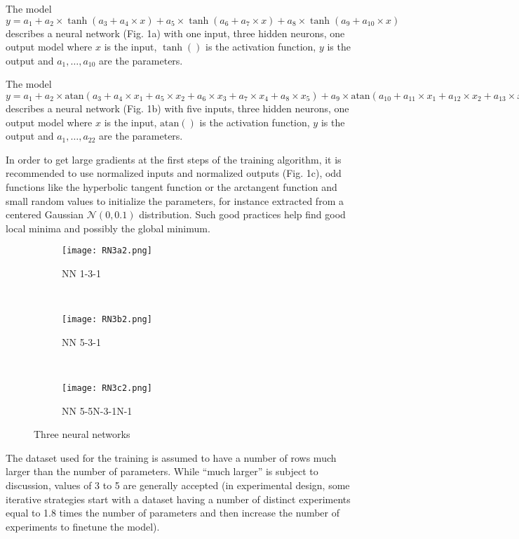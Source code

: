 The model
\(y = a_1 + a_2\times \tanh(a_3 + a_4\times x) + a_5\times \tanh(a_6 + a_7\times x) + a_8\times \tanh(a_9 + a_{10}\times x)\)
describes a neural network (Fig. 1a) with one input, three hidden
neurons, one output model where \(x\) is the input, \(\tanh()\) is the
activation function, \(y\) is the output and \(a_1,\dots,a_{10}\) are
the parameters.

The model
\(y = a_1 + a_2\times \text{atan}(a_3 + a_4\times x_1 + a_5\times x_2 + a_6\times x_3 + a_7\times x_4 + a_8\times x_5) + a_9\times \text{atan}(a_{10} + a_{11}\times x_1 + a_{12}\times x_2 + a_{13}\times x_3 + a_{14}\times x_4 + a_{15}\times x_5) + a_{16}\text{atan}(a_{17} + a_{18}\times x_1 + a_{19}\times x_2 + a_{20}\times x_3 + a_{21}\times x_4 + a_{22}\times x_5)\)
describes a neural network (Fig. 1b) with five inputs, three hidden
neurons, one output model where \(x\) is the input, \(\text{atan}()\) is
the activation function, \(y\) is the output and \(a_1,\dots,a_{22}\)
are the parameters.

In order to get large gradients at the first steps of the training
algorithm, it is recommended to use normalized inputs and normalized
outputs (Fig. 1c), odd functions like the hyperbolic tangent function or
the arctangent function and small random values to initialize the
parameters, for instance extracted from a centered Gaussian
\(\mathcal N(0, 0.1)\) distribution. Such good practices help find good
local minima and possibly the global minimum.

\begin{figure}
    \centering
    \begin{subfigure}[b]{0.242\textwidth}
        \texttt{[image: RN3a2.png]}
        \caption{NN 1-3-1}
        \label{fig:N131}
    \end{subfigure}
    ~ 
    \begin{subfigure}[b]{0.250\textwidth}
        \texttt{[image: RN3b2.png]}
        \caption{NN 5-3-1}
        \label{fig:N531}
    \end{subfigure}
    ~ 
    \begin{subfigure}[b]{0.396\textwidth}
        \texttt{[image: RN3c2.png]}
        \caption{NN 5-5N-3-1N-1}
        \label{fig:N55311}
    \end{subfigure}
    \caption{Three neural networks}
\end{figure}

The dataset used for the training is assumed to have a number of rows
much larger than the number of parameters. While ``much larger'' is
subject to discussion, values of 3 to 5 are generally accepted (in
experimental design, some iterative strategies start with a dataset
having a number of distinct experiments equal to 1.8 times the number of
parameters and then increase the number of experiments to finetune the
model).


